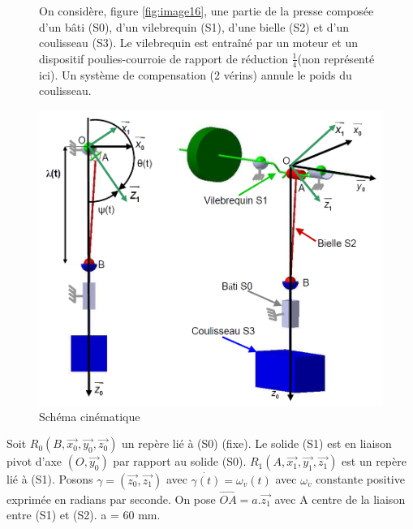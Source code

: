 \begin{figure}[htbp]
\begin{minipage}[c]{.45\linewidth}
On considère, figure \ref{fig:image16}, une partie de la presse composée d'un bâti (S0), d'un vilebrequin (S1), d'une bielle (S2) et d'un coulisseau (S3). Le vilebrequin est entraîné par un moteur et un dispositif \og poulies-courroie \fg de rapport de réduction $\frac{1}{4}$(non représenté ici). Un système de compensation (2 vérins) annule le poids du coulisseau.
\end{minipage}
\hfill
\begin{minipage}[c]{.5\linewidth}
\begin{center}
\includegraphics[width=\linewidth]{img/Poinc_cin2.png}
\caption{Schéma cinématique}
\label{fig:image16b}
\end{center}
\end{minipage}
\end{figure}


Soit $R_0(B,\overrightarrow{x_0},\overrightarrow{y_0},\overrightarrow{z_0})$ un repère lié à (S0) (fixe). Le solide (S1) est en liaison pivot d'axe $(O,\overrightarrow{y_0})$ par rapport au solide (S0). $R_1(A,\overrightarrow{x_1},\overrightarrow{y_1},\overrightarrow{z_1})$ est un repère lié à (S1). Posons $\gamma=(\overrightarrow{z_0},\overrightarrow{z_1})$ avec $\dot{\gamma(t)}=\omega_v(t)$ avec $\omega_v$ constante positive exprimée en radians par seconde. On pose $\overrightarrow{OA}=a.\overrightarrow{z_1}$ avec A centre de la liaison entre (S1) et (S2). a = 60 mm.


